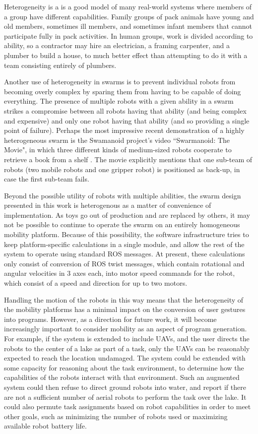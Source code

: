 Heterogeneity is a is a good model of many real-world systems where members of a group have different capabilities. 
Family groups of pack animals have young and old members, sometimes ill members, and sometimes infant members that cannot participate fully in pack activities. 
In human groups, work is divided according to ability, so a contractor may hire an electrician, a framing carpenter, and a plumber to build a house, to  much better effect than attempting to do it with a team consisting entirely of plumbers. 

Another use of heterogeneity in swarms is to prevent individual robots from becoming overly complex by sparing them from having to be capable of doing everything. 
The presence of multiple robots with a given ability in a swarm strikes a compromise between all robots having that ability (and being complex and expensive) and only one robot having that ability (and so providing a single point of failure). 
Perhaps the most impressive recent demonstration of a highly heterogeneous swarm is the Swamanoid project's video ``Swarmanoid: The Movie", in which three different kinds of medium-sized robots cooperate to retrieve a book from a shelf \citep{oʼgrady2011swarmanoid}.
The movie explicitly mentions that one sub-team of robots (two mobile robots and one gripper robot) is positioned as back-up, in case the first sub-team fails. 

Beyond the possible utility of robots with multiple abilities, the swarm design presented in this work is heterogenous as a matter of convenience of implementation. 
As toys go out of production and are replaced by others, it may not be possible to continue to operate the swarm on an entirely homogeneous mobility platform. 
Because of this possibility, the software infrastructure tries to keep platform-specific calculations in a single module, and allow the rest of the system to operate using standard ROS messages. 
At present, these calculations only consist of conversion of ROS twist messages, which contain rotational and angular velocities in 3 axes each, into motor speed commands for the robot, which consist of a speed and direction for up to two motors. 

Handling the motion of the robots in this way means that the heterogeneity of the mobility platforms has a minimal impact on the conversion of user gestures into programs. 
However, as a direction for future work, it will become increasingly important to consider mobility as an aspect of program generation. 
For example, if the system is extended to include UAVs, and the user directs the robots to the center of a lake as part of a task, only the UAVs can be reasonably expected to reach the location undamaged. 
The system could be extended with some capacity for reasoning about the task environment, to determine how the capabilities of the robots interact with that environment. 
Such an augmented system could then refuse to direct ground robots into water, and report if there are not a sufficient number of aerial robots to perform the task over the lake. 
It could also permute task assignments based on robot capabilities in order to meet other goals, such as minimizing the number of robots used or maximizing available robot battery life. 
